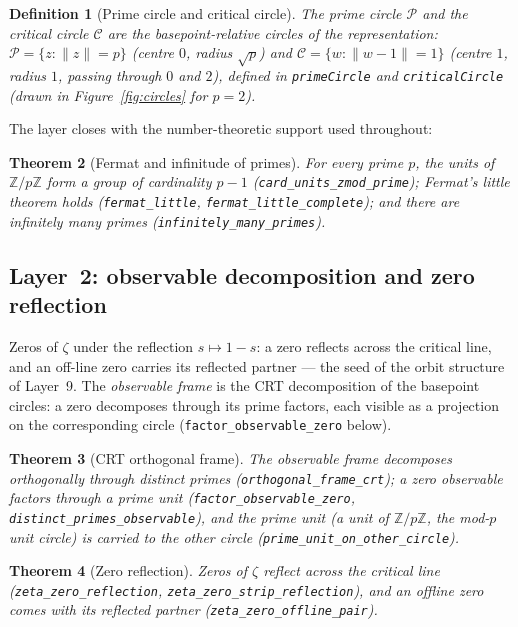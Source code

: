 \documentclass{article}
\newtheorem{theorem}{Theorem}[section]
\newtheorem{definition}[theorem]{Definition}
\newcommand{\Z}{\mathbb{Z}}
\newcommand{\zt}{\zeta}
\begin{document}
\begin{definition}[Prime circle and critical circle]
The \emph{prime circle} $\mathcal{P}$ and the \emph{critical circle}
$\mathcal{C}$ are the basepoint-relative circles of the representation:
$\mathcal P=\{z:\|z\|=p\}$ (centre $0$, radius $\sqrt p$) and
$\mathcal C=\{w:\|w-1\|=1\}$ (centre $1$, radius $1$, passing through $0$
and $2$), defined in \texttt{primeCircle} and \texttt{criticalCircle}
(drawn in Figure~\ref{fig:circles} for $p=2$).
\end{definition}

The layer closes with the number-theoretic support used throughout:

\begin{theorem}[Fermat and infinitude of primes]
\label{thm:fermat}
For every prime $p$, the units of $\Z/p\Z$ form a group of cardinality
$p-1$ (\texttt{card\_units\_zmod\_prime}); Fermat's little theorem holds
(\texttt{fermat\_little}, \texttt{fermat\_little\_complete}); and there are
infinitely many primes (\texttt{infinitely\_many\_primes}).
\end{theorem}

\subsection{Layer~2: observable decomposition and zero reflection}
\label{sec:L2}

Zeros of $\zt$ under the reflection $s\mapsto 1-s$: a zero reflects
across the critical line, and an off-line zero carries its reflected
partner --- the seed of the orbit structure of Layer~9. The
\emph{observable frame} is the CRT decomposition of the basepoint
circles: a zero decomposes through its prime factors, each visible as a
projection on the corresponding circle
(\texttt{factor\_observable\_zero} below).

\begin{theorem}[CRT orthogonal frame]
\label{thm:crt}
The observable frame decomposes orthogonally through distinct primes
(\texttt{orthogonal\_frame\_crt}); a zero observable factors through a prime
unit (\texttt{factor\_observable\_zero},
\texttt{distinct\_primes\_observable}), and the prime unit (a unit of
$\Z/p\Z$, the mod-$p$ unit circle) is carried to the
other circle (\texttt{prime\_unit\_on\_other\_circle}).
\end{theorem}

\begin{theorem}[Zero reflection]
\label{thm:zeroreflect}
Zeros of $\zt$ reflect across the critical line
(\texttt{zeta\_zero\_reflection}, \texttt{zeta\_zero\_strip\_reflection}),
and an offline zero comes with its reflected partner
(\texttt{zeta\_zero\_offline\_pair}).
\end{theorem}
\end{document}
